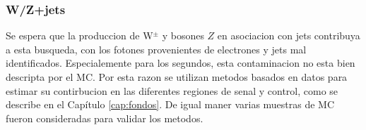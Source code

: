 \begin{table}[ht!]
\begin{tabular}{ l | c | c | c | c }
    \hline
    \hline
  \end{tabular}
  \label{tab:bkg_wzgamma_samples}
\end{table}

\subsubsection{W/Z+jets} \label{mc_wzjets}

Se espera que la produccion de W$^{\pm}$ y bosones $Z$ en asociacion con jets
contribuya a esta busqueda, con los fotones provenientes de electrones y jets
mal identificados. Especialemente para los segundos, esta contaminacion no esta
bien descripta por el MC. Por esta razon se utilizan metodos basados en datos
para estimar su contirbucion en las diferentes regiones de senal y control, como
se describe en el Capítulo \ref{cap:fondos}. De igual maner varias muestras de MC
fueron consideradas para validar los metodos.

